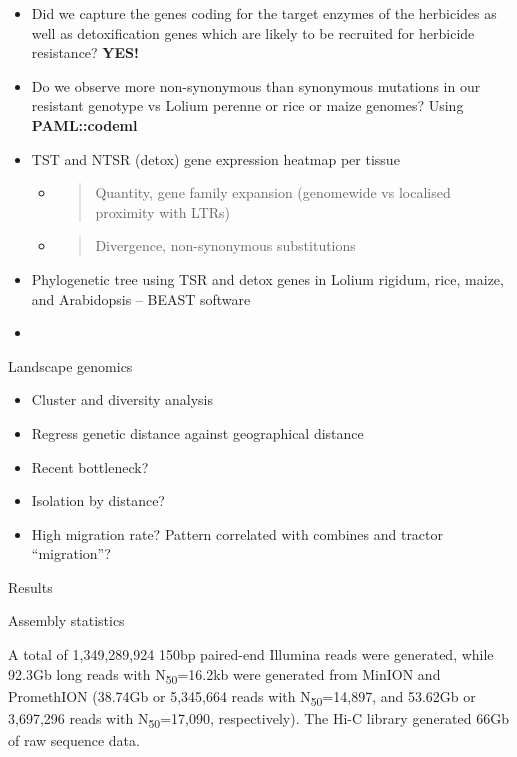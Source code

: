 \begin{itemize}
\item
  Did we capture the genes coding for the target enzymes of the
  herbicides as well as detoxification genes which are likely to be
  recruited for herbicide resistance? \textbf{YES!}
\item
  Do we observe more non-synonymous than synonymous mutations in our
  resistant genotype vs Lolium perenne or rice or maize genomes? Using
  \textbf{PAML::codeml}
\item
  TST and NTSR (detox) gene expression heatmap per tissue

  \begin{itemize}
  \item
    \begin{quote}
    Quantity, gene family expansion (genomewide vs localised proximity
    with LTRs)
    \end{quote}
  \item
    \begin{quote}
    Divergence, non-synonymous substitutions
    \end{quote}
  \end{itemize}
\item
  Phylogenetic tree using TSR and detox genes in Lolium rigidum, rice,
  maize, and Arabidopsis -- BEAST software
\item
\end{itemize}

\protect\hypertarget{anchor-11}{}{}Landscape genomics

\begin{itemize}
\tightlist
\item
  Cluster and diversity analysis
\item
  Regress genetic distance against geographical distance
\item
  Recent bottleneck?
\item
  Isolation by distance?
\item
  High migration rate? Pattern correlated with combines and tractor
  ``migration''?
\end{itemize}

\protect\hypertarget{anchor-12}{}{}

\protect\hypertarget{anchor-13}{}{}Results

\protect\hypertarget{anchor-14}{}{}Assembly statistics

A total of 1,349,289,924 150bp paired-end Illumina reads were generated,
while 92.3Gb long reads with N\textsubscript{50}=16.2kb were generated
from MinION and PromethION (38.74Gb or 5,345,664 reads with
N\textsubscript{50}=14,897, and 53.62Gb or 3,697,296 reads with
N\textsubscript{50}=17,090, respectively). The Hi-C library generated
66Gb of raw sequence data.

